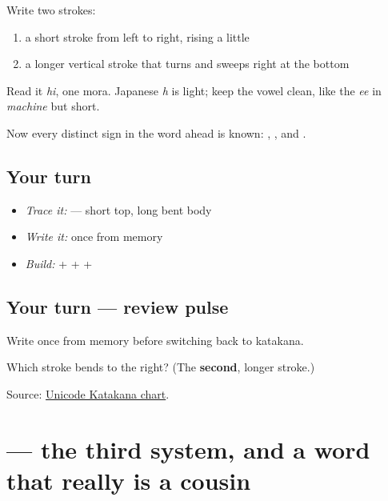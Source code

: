 \begin{quote}
\end{quote}

Write two strokes:

\begin{enumerate}
\raggedright
  \item a short stroke from left to right, rising a little
  \item a longer vertical stroke that turns and sweeps right at the bottom
\end{enumerate}

Read it \emph{hi}, one mora. Japanese \emph{h} is light; keep the vowel clean, like the \emph{ee} in \emph{machine} but short.

Now every distinct sign in the word ahead is known: , , and .

\subsection*{Your turn}
\begin{itemize}
\raggedright
  \item \emph{Trace it:}  — short top, long bent body
  \item \emph{Write it:}  once from memory
  \item \emph{Build:}  +  +  + 
\end{itemize}

\subsection*{Your turn — review pulse}
Write \textbf{} once from memory before switching back to katakana.

\begin{tcolorbox}[breakable,colback=teal!4,colframe=teal!35!black,title={Before you move on}]
Which stroke bends to the right? (The \textbf{second}, longer stroke.)

Source: \href{https://www.unicode.org/charts/PDF/U30A0.pdf}{Unicode Katakana chart}.
\end{tcolorbox}
\section[\texorpdfstring{\ja{コーヒー} (kōhī)}{コーヒー (kōhī)}]{ — the third system, and a word that really is a cousin}

\label{lesson:JA-C01-koohii}



